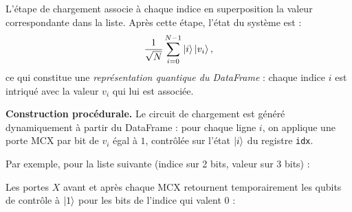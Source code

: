 \documentclass{ceri/sty/rapport}
\begin{document}
L'étape de chargement associe à chaque indice en superposition la valeur
correspondante dans la liste. Après cette étape, l'état du système est :
\[
  \frac{1}{\sqrt{N}} \sum_{i=0}^{N-1} \ket{i}\ket{v_i},
\]
ce qui constitue une \emph{représentation quantique du DataFrame} : chaque indice
$i$ est intriqué avec la valeur $v_i$ qui lui est associée.

\medskip
\textbf{Construction procédurale.}
Le circuit de chargement est généré dynamiquement à partir du DataFrame :
pour chaque ligne $i$, on applique une porte MCX par bit de $v_i$ égal à $1$,
contrôlée sur l'état $\ket{i}$ du registre \texttt{idx}.

Par exemple, pour la liste suivante (indice sur 2 bits, valeur sur 3 bits) :

\medskip
\noindent{}

\medskip\noindent
Les portes $X$ avant et après chaque MCX retournent temporairement les qubits de
contrôle à $\ket{1}$ pour les bits de l'indice qui valent $0$ :
\end{document}
